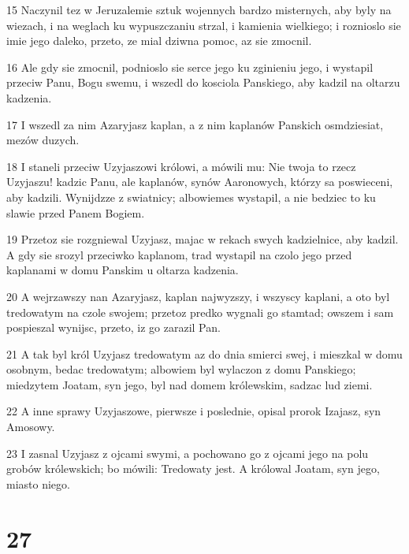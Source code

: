 \par 15 Naczynil tez w Jeruzalemie sztuk wojennych bardzo misternych, aby byly na wiezach, i na weglach ku wypuszczaniu strzal, i kamienia wielkiego; i roznioslo sie imie jego daleko, przeto, ze mial dziwna pomoc, az sie zmocnil.
\par 16 Ale gdy sie zmocnil, podnioslo sie serce jego ku zginieniu jego, i wystapil przeciw Panu, Bogu swemu, i wszedl do kosciola Panskiego, aby kadzil na oltarzu kadzenia.
\par 17 I wszedl za nim Azaryjasz kaplan, a z nim kaplanów Panskich osmdziesiat, mezów duzych.
\par 18 I staneli przeciw Uzyjaszowi królowi, a mówili mu: Nie twoja to rzecz Uzyjaszu! kadzic Panu, ale kaplanów, synów Aaronowych, którzy sa poswieceni, aby kadzili. Wynijdzze z swiatnicy; albowiemes wystapil, a nie bedziec to ku slawie przed Panem Bogiem.
\par 19 Przetoz sie rozgniewal Uzyjasz, majac w rekach swych kadzielnice, aby kadzil. A gdy sie srozyl przeciwko kaplanom, trad wystapil na czolo jego przed kaplanami w domu Panskim u oltarza kadzenia.
\par 20 A wejrzawszy nan Azaryjasz, kaplan najwyzszy, i wszyscy kaplani, a oto byl tredowatym na czole swojem; przetoz predko wygnali go stamtad; owszem i sam pospieszal wynijsc, przeto, iz go zarazil Pan.
\par 21 A tak byl król Uzyjasz tredowatym az do dnia smierci swej, i mieszkal w domu osobnym, bedac tredowatym; albowiem byl wylaczon z domu Panskiego; miedzytem Joatam, syn jego, byl nad domem królewskim, sadzac lud ziemi.
\par 22 A inne sprawy Uzyjaszowe, pierwsze i poslednie, opisal prorok Izajasz, syn Amosowy.
\par 23 I zasnal Uzyjasz z ojcami swymi, a pochowano go z ojcami jego na polu grobów królewskich; bo mówili: Tredowaty jest. A królowal Joatam, syn jego, miasto niego.

\chapter{27}


